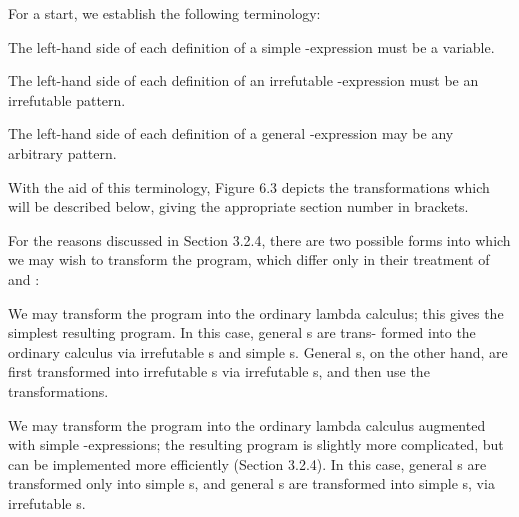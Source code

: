 {For a start, we establish the following terminology:
\begin{numbered}
	\item The left-hand side of each definition of a simple -expression must
	be a variable.
	\item The left-hand side of each definition of an irrefutable -expression
	must be an irrefutable pattern.
	\item The left-hand side of each definition of a general -expression may
	be any arbitrary pattern.
\end{numbered}
With the aid of this terminology, Figure 6.3 depicts the transformations which
will be described below, giving the appropriate section number in brackets.

For the reasons discussed in Section 3.2.4, there are two possible forms into
which we may wish to transform the program, which differ only in their
treatment of  and :
\begin{numbered}
	\item We may transform the program into the ordinary lambda calculus; this
	gives the simplest resulting program. In this case, general s are trans-
	formed into the ordinary calculus via irrefutable s and simple s.
	General s, on the other hand, are first transformed into irrefutable
	s via irrefutable s, and then use the  transformations.
	\item We may transform the program into the ordinary lambda calculus
	augmented with simple -expressions; the resulting program is
	slightly more complicated, but can be implemented more efficiently
	(Section 3.2.4). In this case, general s are transformed only into simple
	s, and general s are transformed into simple s, via irrefutable
	s.
\end{numbered}

\begin{figure}[H]
	\centering

\end{figure}}
